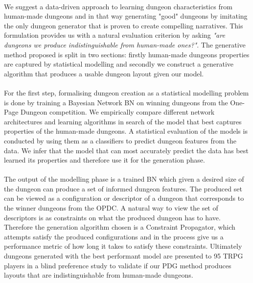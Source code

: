 \documentclass{UoYCSproject}
\begin{document}
\begin{summary}
\paragraph{}
We suggest a data-driven approach to learning dungeon characteristics from human-made dungeons and in that way generating "good" dungeons by imitating the only dungeon generator that is proven to create compelling narratives. This formulation provides us with a natural evaluation criterion by asking \textit{"are dungeons we produce indistinguishable from human-made ones?"}.
The generative method proposed is split in two sections: firstly human-made dungeons properties are captured by statistical modelling and secondly we construct a generative algorithm that produces a usable dungeon layout given our model.

\paragraph{}
For the first step, formalising dungeon creation as a statistical modelling problem is done by training a Bayesian Network BN on winning dungeons from the One-Page Dungeon competition. We empirically compare different network architectures and learning algorithms in search of the model that best captures properties of the human-made dungeons. A statistical evaluation of the models is conducted by using them as a classifiers to predict dungeon features from the data. We infer that the model that can most accurately predict the data has best learned its properties and therefore use it for the generation phase.

\paragraph{}
The output of the modelling phase is a trained BN which given a desired size of the dungeon can produce a set of informed dungeon features. The produced set can be viewed as a configuration or descriptor of a dungeon that corresponds to the winner dungeons from the OPDC.
A natural way to view the set of descriptors is as constraints on what the produced dungeon has to have. Therefore the generation algorithm chosen is a Constraint Propagator, which attempts satisfy the produced configurations and in the process give us a performance metric of how long it takes to satisfy these constraints. Ultimately dungeons generated with the best performant model are presented to 95 TRPG players in a blind preference study to validate if our PDG method produces layouts that are indistinguishable from human-made dungeons.


\end{summary}
\end{document}

